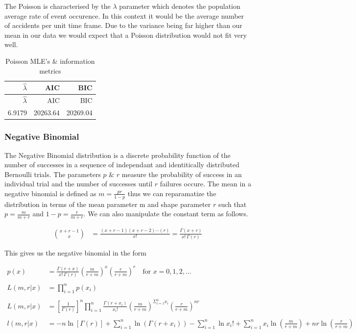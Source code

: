 \documentclass[11pt,preprint, authoryear]{elsarticle}
\numberwithin{equation}{section}
\numberwithin{figure}{section}
\numberwithin{table}{section}
\begin{document}
The Poisson is characterised by the \(\lambda\) parameter which denotes
the population average rate of event occurence. In this context it would
be the average number of accidents per unit time frame. Due to the
variance being far higher than our mean in our data we would expect that
a Poisson distribution would not fit very well.

\begin{longtable}[]{@{}rrr@{}}
\caption{Poisson MLE's \& information metrics}\tabularnewline
\toprule
\(\hat{\lambda}\) & AIC & BIC\tabularnewline
\midrule
\endfirsthead
\toprule
\(\hat{\lambda}\) & AIC & BIC\tabularnewline
\midrule
\endhead
6.9179 & 20263.64 & 20269.04\tabularnewline
\bottomrule
\end{longtable}

\subsubsection{Negative Binomial}\label{negative-binomial}

The Negative Binomial distribution is a discrete probability function of
the number of successes in a sequence of independant and identitically
distributed Bernoulli trials. The parameters \(p\) \& \(r\) measure the
probability of success in an individual trial and the number of
successes until \(r\) failures occure. The mean in a negative binomial
is defined as \(m={\frac{pr}{1-p}}\) thus we can reparamatize the
distribution in terms of the mean parameter m and shape parameter \(r\)
such that \(p={\frac{m}{m+r}}\) and \(1-p={\frac{r}{m+r}}\). We can also
manipulate the constant term as follows.

\begin{align*}
\binom{x+r-1}{x} &= {\frac {(x+r-1)(x+r-2)\dotsm (r)}{x!}} = {\frac {\Gamma(x+r)}{x!\,\Gamma (r)}}
\end{align*}

This gives us the negative binomial in the form

\begin{align*} 
p(x) & =  {\frac {\Gamma (r+x)}{x!\,\Gamma (r)}}\left({\frac {m}{r+m}}\right)^{x}\left({\frac {r}{r+m}}\right)^{r}\quad {\text{for }}x=0,1,2,\dotsc \\
\\
L(m,r|x) & = \prod_{i=1}^n p(x_i) \\
\\
L(m,r|x) & ={[\frac{1}{\Gamma (r)}]}^{n} \prod_{i=1}^{n}{\frac{\Gamma (r+x_i)}{x_{i}!}} (\frac{m}{r + m})^{\Sigma_{i=1}^n x_i} (\frac{r}{r + m})^{nr}   \\
\\
l(m,r|x) & = -n\ln[\Gamma (r)] + \sum^{n}_{i=1} \ln(\Gamma (r + x_i)) -\sum^{n}_{i=1}\ln x_i! + \sum^{n}_{i=1} x_{i} \ln (\frac{m}{r + m}) + nr \ln (\frac{r}{r + m})
\end{align*}
\end{document}
